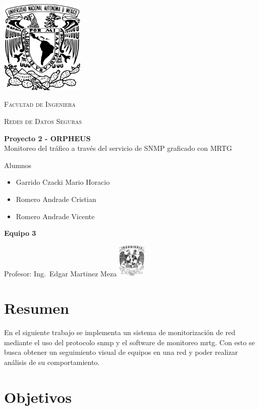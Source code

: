 \documentclass[letterpaper]{article}
\begin{document}
\begin{titlepage}
  \centering
  \includegraphics[width=0.3\textwidth]{unam_logo}\vfill{}
  {\scshape\Huge Facultad de Ingeniera\par}\vspace{0.5cm}
  {\scshape\Large Redes de Datos Seguras\par}\vfill
  {\huge \textbf{Proyecto 2 - ORPHEUS}\\Monitoreo del tráfico a través del
servicio de SNMP graficado con MRTG}\vfill
  
  {\Large
    Alumnos\begin{itemize}
    \item Garrido Czacki Mario Horacio
    \item Romero Andrade Cristian
    \item Romero Andrade Vicente

    \end{itemize}
    \textbf{Equipo 3}
  }\vfill
  {\large Profesor: Ing.~Edgar Martinez Meza}\vfill
  \includegraphics[width=0.1\textwidth]{inge_logo}
  
  
\end{titlepage}

\tableofcontents{}\newpage

\section{Resumen}\label{sec:resumen}

En el siguiente trabajo se implementa un sistema de
monitorización de red mediante el uso del protocolo \acrshort{snmp} y 
el software de monitoreo \acrshort{mrtg}. 
Con esto se busca obtener un seguimiento visual de equipos en una red y poder realizar
análisis de su comportamiento.

\section{Objetivos}\label{sec:obj}
\end{document}
